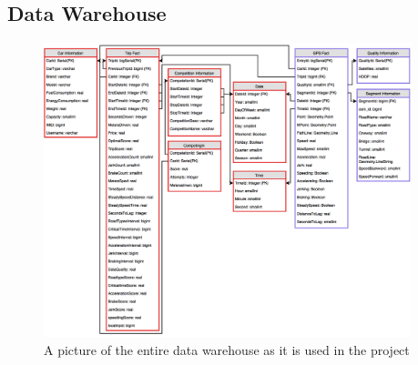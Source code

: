 \subsection*{Data Warehouse}\label{app:datawarehouse}

\begin{figure}[tb]
\centering
\includegraphics[width=0.95\textwidth]{Pictures/newdatawarehouse}
\caption{A picture of the entire data warehouse as it is used in the project}
\label{app:fig:newdatawarehouse}
\end{figure}